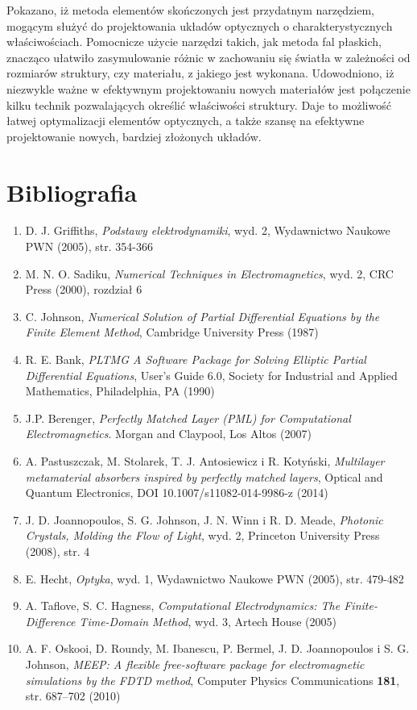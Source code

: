 \documentclass[12pt,a4paper]{article}
\newcommand{\chaptertitle}[1]{\section*{#1}\addcontentsline{toc}{section}{#1}}
\begin{document}
Pokazano, iż metoda elementów skończonych jest przydatnym narzędziem, mogącym służyć
do projektowania układów optycznych o charakterystycznych właściwościach. Pomocnicze użycie
narzędzi takich, jak metoda fal płaskich, znacząco ułatwiło zasymulowanie różnic w zachowaniu się
światła w zależności od rozmiarów struktury, czy materiału, z jakiego jest wykonana.
Udowodniono, iż niezwykle ważne w efektywnym projektowaniu nowych materiałów jest
połączenie kilku technik pozwalających określić właściwości struktury. Daje to możliwość łatwej
optymalizacji elementów optycznych, a także szansę na efektywne projektowanie nowych, bardziej
złożonych układów.

\newpage
\chaptertitle{Bibliografia}

\begin{enumerate}
\renewcommand{\labelenumi}{[\arabic{enumi}]}
\item D. J. Griffiths, \textit{Podstawy elektrodynamiki}, wyd. 2, Wydawnictwo Naukowe PWN (2005), str. 354-366
\item M. N. O. Sadiku, \textit{Numerical Techniques in Electromagnetics}, wyd. 2, CRC Press (2000), rozdział 6
\item C. Johnson, \textit{Numerical Solution of Partial Differential Equations by the Finite Element Method}, Cambridge University Press (1987)
\item R. E. Bank, \textit{PLTMG A Software Package for Solving Elliptic Partial Differential Equations}, User’s Guide 6.0, Society for Industrial and Applied Mathematics, Philadelphia, PA (1990)
\item J.P. Berenger, \textit{Perfectly Matched Layer (PML) for Computational Electromagnetics}. Morgan and Claypool, Los Altos (2007)
\item A. Pastuszczak, M. Stolarek, T. J. Antosiewicz i R. Kotyński, \textit{Multilayer metamaterial absorbers inspired by perfectly matched layers}, Optical and Quantum Electronics, DOI 10.1007/s11082-014-9986-z (2014)
\item J. D. Joannopoulos, S. G. Johnson, J. N. Winn i R. D. Meade, \textit{Photonic Crystals, Molding the Flow of Light}, wyd. 2, Princeton University Press (2008), str. 4
\item E. Hecht, \textit{Optyka}, wyd. 1, Wydawnictwo Naukowe PWN (2005), str. 479-482
\item A. Taflove, S. C. Hagness, \textit{Computational Electrodynamics: The Finite-Difference Time-Domain Method}, wyd. 3, Artech House (2005)
\item A. F. Oskooi, D. Roundy, M. Ibanescu, P. Bermel, J. D. Joannopoulos i S. G. Johnson, \textit{MEEP: A flexible free-software package for electromagnetic simulations by the FDTD method}, Computer Physics Communications \textbf{181}, str. 687--702 (2010)

\end{enumerate}
\end{document}
